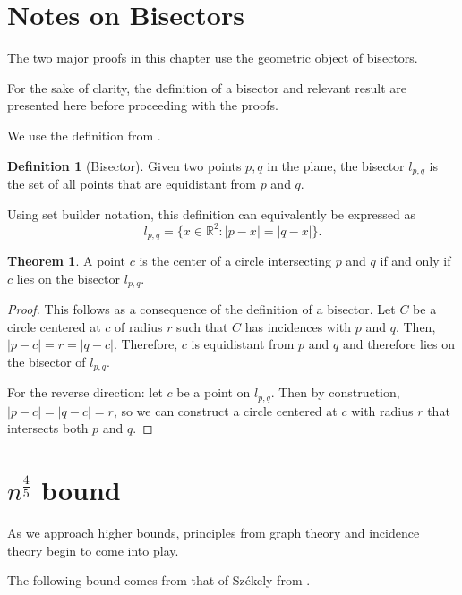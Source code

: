 \documentclass{scrippsthesisclass}
\theoremstyle{definition}
\newtheorem{defn}{Definition}[section]
\newtheorem{theorem}{Theorem}[section]
\begin{document}
\section{Notes on Bisectors}
The two major proofs in this chapter use the geometric object of bisectors. 

For the sake of clarity, the definition of a bisector and relevant result are presented here before proceeding with the proofs. 

We use the definition from \cite{thebook}. 

\begin{defn}[Bisector]
    Given two points $p, q$ in the plane, the bisector $l_{p, q}$ is the set of all points that are equidistant from $p$ and $q$.
\end{defn}
Using set builder notation, this definition can equivalently be expressed as
\[
l_{p, q} = \{x \in \mathbb{R}^2 : |p - x| = |q - x|\}. 
\]

\begin{theorem}
    A point $c$ is the center of a circle intersecting $p$ and $q$ if and only if $c$ lies on the bisector $l_{p, q}$.
\end{theorem}
\begin{proof}
    This follows as a consequence of the definition of a bisector. 
    Let $C$ be a circle centered at $c$ of radius $r$ such that $C$ has incidences with $p$ and $q$. 
    Then, $|p - c| = r = |q - c|$.
    Therefore, $c$ is equidistant from $p$ and $q$ and therefore lies on the bisector of $l_{p, q}$. 

    For the reverse direction: let $c$ be a point on $l_{p, q}$.
    Then by construction, $|p - c| = |q - c| = r$, so we can construct a circle centered at $c$ with radius $r$ that intersects both $p$ and $q$.
\end{proof}

\section{$n^{\frac{4}{5}}$ bound}
As we approach higher bounds, principles from graph theory and incidence theory begin to come into play. 

The following bound comes from that of Sz\'{e}kely from \cite{SzekelyPaper}.
\end{document}
